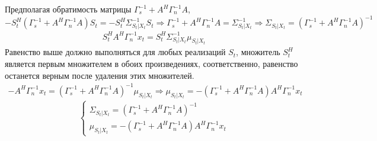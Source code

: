 \documentclass[11pt]{article}
\begin{document}
Предполагая обратимость матрицы $\Gamma_s^{-1}+ A^H \Gamma_n^{-1} A$,
\begin{equation*}
-S_t^H(\Gamma_s^{-1}+A^H \Gamma_n^{-1} A)S_t = -S_t^H \Sigma_{S_t|X_t}^{-1}S_t  \Rightarrow \Gamma_s^{-1}+ A^H \Gamma_n^{-1} A= \Sigma_{S_t|X_t}^{-1} \Rightarrow \Sigma_{S_t|X_t} = (\Gamma_s^{-1}+ A^H \Gamma_n^{-1} A)^{-1}
\end{equation*}
\begin{gather*}
S_t^H A^H\Gamma_n^{-1}x_t = S_t^H \Sigma_{S_t|X_t}^{-1}\mu_{S_t|X_t}
\end{gather*}
Равенство выше должно выполняться для любых реализаций $S_t$, множитель $S_t^H$ является первым множителем в обоих произведениях, соответственно, равенство останется верным после удаления этих множителей.
\begin{gather*}
-A^H\Gamma_n^{-1}x_t = (\Gamma_s^{-1}+ A^H \Gamma_n^{-1} A)^{-1} \mu_{S_t|X_t} \Rightarrow \mu_{S_t|X_t} =- (\Gamma_s^{-1}+ A^H \Gamma_n^{-1} A) A^H\Gamma_n^{-1}x_t
\end{gather*}
\begin{equation}
\left\{ \begin{gathered} 
\Sigma_{S_t|X_t} = (\Gamma_s^{-1}+ A^H \Gamma_n^{-1} A)^{-1} \\
\mu_{S_t|X_t} =- (\Gamma_s^{-1}+ A^H \Gamma_n^{-1} A) A^H\Gamma_n^{-1}x_t
\end{gathered} \right.
\end{equation}
\end{document}
